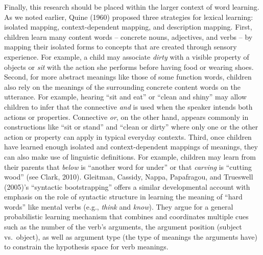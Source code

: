 \documentclass[
  english,
  ,man,floatsintext]{apa6}
\begin{document}
Finally, this research should be placed within the larger context of word learning. As we noted earlier, Quine (1960) proposed three strategies for lexical learning: isolated mapping, context-dependent mapping, and description mapping. First, children learn many content words -- concrete nouns, adjectives, and verbs -- by mapping their isolated forms to concepts that are created through sensory experience. For example, a child may associate \emph{dirty} with a visible property of objects or \emph{sit} with the action she performs before having food or wearing shoes. Second, for more abstract meanings like those of some function words, children also rely on the meanings of the surrounding concrete content words on the utterance. For example, hearing ``sit and eat'' or ``clean and shiny'' may allow children to infer that the connective \emph{and} is used when the speaker intends both actions or properties. Connective \emph{or}, on the other hand, appears commonly in constructions like ``sit or stand'' and ``clean or dirty'' where only one or the other action or property can apply in typical everyday contexts. Third, once children have learned enough isolated and context-dependent mappings of meanings, they can also make use of linguistic definitions. For example, children may learn from their parents that \emph{below} is ``another word for under'' or that \emph{carving} is ``cutting wood'' (see Clark, 2010). Gleitman, Cassidy, Nappa, Papafragou, and Trueswell (2005)'s ``syntactic bootstrapping'' offers a similar developmental account with emphasis on the role of syntactic structure in learning the meaning of ``hard words'' like mental verbs (e.g., \emph{think} and \emph{know}). They argue for a general probabilistic learning mechanism that combines and coordinates multiple cues such as the number of the verb's arguments, the argument position (subject vs.~object), as well as argument type (the type of meanings the arguments have) to constrain the hypothesis space for verb meanings.
\end{document}

